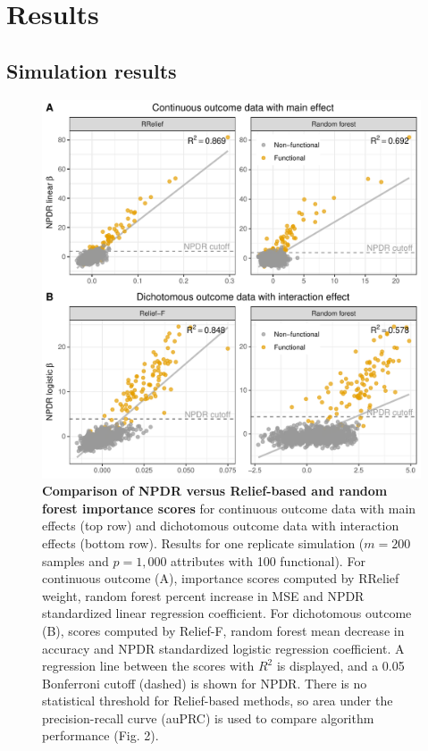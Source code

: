 \documentclass[10pt]{article}
\begin{document}

\section{Results}
\subsection{Simulation results} 

\begin{figure}[!tbp]
\centerline{\includegraphics[trim = 0 0 0 0]{../figs/fig1.pdf}}
\caption{{\bf Comparison of NPDR versus Relief-based and random forest importance scores} for continuous outcome data with main effects (top row) and dichotomous outcome data with interaction effects (bottom row). Results for one replicate simulation ($m = 200$ samples and $p = 1,000$ attributes with 100 functional). For continuous outcome (A), importance scores computed by RRelief weight, random forest percent increase in MSE and NPDR standardized linear regression coefficient. For dichotomous outcome (B), scores computed by Relief-F, random forest mean decrease in accuracy and NPDR standardized logistic regression coefficient. A regression line between the scores with $R^2$ is displayed, and a 0.05 Bonferroni cutoff (dashed) is shown for NPDR. There is no statistical threshold for Relief-based methods, so area under the precision-recall curve (auPRC) is used to compare algorithm performance (Fig. 2).}
\label{fig:npdr_relief}
\end{figure}
\end{document}
